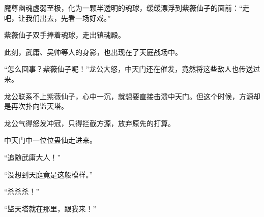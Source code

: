 \begin{this_body}
魔尊幽魂虚弱至极，化为一颗半透明的魂球，缓缓漂浮到紫薇仙子的面前：“走吧，让我们出去，先看一场好戏。”

紫薇仙子双手捧着魂球，走出镇魂殿。

此刻，武庸、吴帅等人的身影，也出现在了天庭战场中。

“怎么回事？紫薇仙子呢！”龙公大怒，中天门还在催发，竟然将这些敌人也传送过来。

龙公联系不上紫薇仙子，心中一沉，就想要直接击溃中天门。但这个时候，方源却是再次扑向监天塔。

龙公气得怒发冲冠，只得拦截方源，放弃原先的打算。

中天门中一位位蛊仙走进来。

“追随武庸大人！”

“没想到天庭竟是这般模样。”

“杀杀杀！”

“监天塔就在那里，跟我来！”

\end{this_body}

